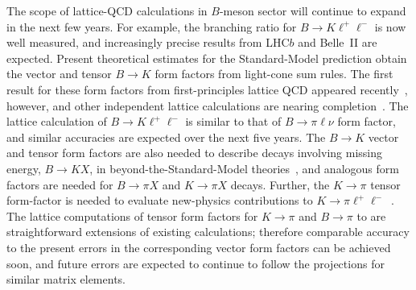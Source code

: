 \begin{itemize}
The scope of lattice-QCD calculations in $B$-meson sector will continue to expand in the next few years.  For example, the branching ratio for $B\to K\ell^+\ell^-$ is now well measured, and increasingly precise results from LHC$b$ and Belle~II are expected.  Present theoretical estimates for the Standard-Model prediction obtain the vector and tensor $B\to K$ form factors from light-cone sum rules.  The first result for these form factors from first-principles lattice QCD appeared recently~\cite{Bouchard:2013eph}, however, and other independent lattice calculations are nearing completion~\cite{Zhou:2012dm}.  The lattice calculation of $B\to K\ell^+\ell^-$ is similar to that of $B\to\pi\ell\nu$ form factor, and similar accuracies are expected over the next five years.  The $B\to K$ vector and tensor form factors are also needed to describe decays involving missing energy, $B\to K X$, in beyond-the-Standard-Model theories~\cite{Kamenik:2011vy}, and analogous form factors are needed for $B\to\pi X$ and  $K\to\pi X$ decays.  Further, the $K\to\pi$ tensor form-factor is needed to evaluate new-physics contributions to $K\to\pi\ell^+\ell^-$~\cite{Baum:2011rm}.  The lattice computations of tensor form factors for $K\to\pi$ and $B\to\pi$ to are straightforward extensions of existing calculations; therefore comparable accuracy to the present errors in the corresponding vector form factors can be achieved soon, and future errors are expected to continue to follow the projections for similar matrix elements.


\end{itemize}
